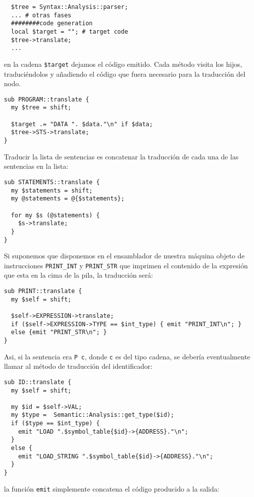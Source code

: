 \begin{verbatim}
  $tree = Syntax::Analysis::parser;
  ... # otras fases
  ########code generation
  local $target = ""; # target code
  $tree->translate;
  ...
\end{verbatim}

en la cadena \verb|$target| dejamos el código emitido.
Cada método visita los hijos, traduciéndolos y añadiendo 
el código que fuera necesario para la traducción del nodo.

\begin{verbatim}
sub PROGRAM::translate {
  my $tree = shift;

  $target .= "DATA ". $data."\n" if $data;
  $tree->STS->translate;
}
\end{verbatim}

Traducir la lista de sentencias es concatenar la traducción
de cada una de las sentencias en la lista:

\begin{verbatim}
sub STATEMENTS::translate {
  my $statements = shift;
  my @statements = @{$statements};

  for my $s (@statements) {
    $s->translate;
  }
}
\end{verbatim}

Si suponemos que disponemos en el ensamblador de nuestra máquina
objeto de instrucciones \verb|PRINT_INT|  y \verb|PRINT_STR|
que imprimen el contenido 
de la expresión que esta en la cima de la pila, la traducción será:

\begin{verbatim}
sub PRINT::translate {
  my $self = shift;

  $self->EXPRESSION->translate;
  if ($self->EXPRESSION->TYPE == $int_type) { emit "PRINT_INT\n"; }
  else {emit "PRINT_STR\n"; }
}
\end{verbatim}
Asi, si la sentencia era \verb|P c|, donde \verb|c| es del tipo cadena, 
se debería eventualmente llamar al método de traducción del identificador:

\begin{verbatim}
sub ID::translate {
  my $self = shift;

  my $id = $self->VAL;
  my $type =  Semantic::Analysis::get_type($id);
  if ($type == $int_type) {
    emit "LOAD ".$symbol_table{$id}->{ADDRESS}."\n";
  }
  else {
    emit "LOAD_STRING ".$symbol_table{$id}->{ADDRESS}."\n";
  }
}
\end{verbatim}
la función \verb|emit| simplemente concatena el código 
producido a la salida:

